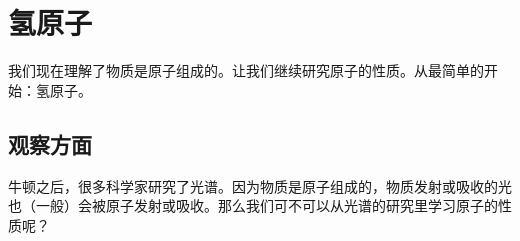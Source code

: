 \section{氢原子} \label{sec:atom-hydrogen}

我们现在理解了物质是原子组成的。让我们继续研究原子的性质。从最简单的开始：氢原子。

\subsection{观察方面}

牛顿之后，很多科学家研究了光谱。因为物质是原子组成的，物质发射或吸收的光也（一般）会被原子发射或吸收。那么我们可不可以从光谱的研究里学习原子的性质呢？

